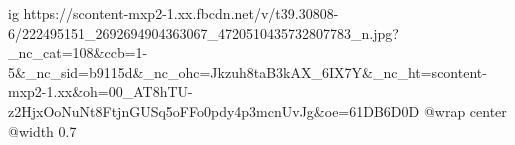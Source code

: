  
 
 
 
 

\ifcmt
  ig https://scontent-mxp2-1.xx.fbcdn.net/v/t39.30808-6/222495151_2692694904363067_4720510435732807783_n.jpg?_nc_cat=108&ccb=1-5&_nc_sid=b9115d&_nc_ohc=Jkzuh8taB3kAX_6IX7Y&_nc_ht=scontent-mxp2-1.xx&oh=00_AT8hTU-z2HjxOoNuNt8FtjnGUSq5oFFo0pdy4p3mcnUvJg&oe=61DB6D0D
	@wrap center
	@width 0.7
\fi
